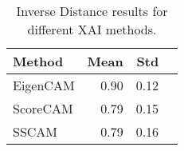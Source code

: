 \begin{table}[h]
    \centering
    \begin{tabular}{lrrr}
        \hline
        \textbf{Method} & \textbf{Mean} & \textbf{Std}\\
        \hline
        \rowcolor{yellow!20}
        EigenCAM & 0.90 & 0.12 \\
        ScoreCAM & 0.79 & 0.15 \\
        SSCAM & 0.79 & 0.16 \\
        \hline
    \end{tabular}
    \caption{Inverse Distance results for different XAI methods.}
    \label{tab:xai-inverse-distance}
\end{table}